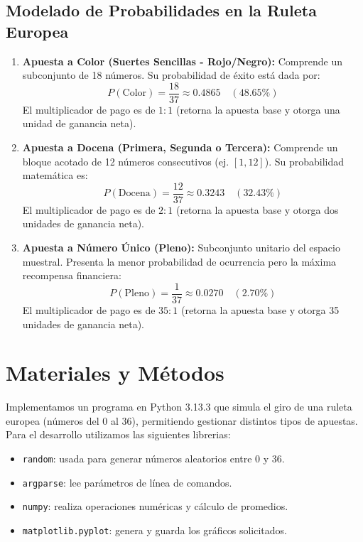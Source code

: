 \documentclass{article}
\begin{document}
\subsection{Modelado de Probabilidades en la Ruleta Europea}
\begin{enumerate}
    \item \textbf{Apuesta a Color (Suertes Sencillas - Rojo/Negro):} Comprende un subconjunto de 18 números. Su probabilidad de éxito está dada por:
    \begin{equation}
        P(\text{Color}) = \frac{18}{37} \approx 0.4865 \quad (48.65\%)
    \end{equation}
    El multiplicador de pago es de $1:1$ (retorna la apuesta base y otorga una unidad de ganancia neta).
    \item \textbf{Apuesta a Docena (Primera, Segunda o Tercera):} Comprende un bloque acotado de 12 números consecutivos (ej. $[1, 12]$). Su probabilidad matemática es:
    \begin{equation}
        P(\text{Docena}) = \frac{12}{37} \approx 0.3243 \quad (32.43\%)
    \end{equation}
    El multiplicador de pago es de $2:1$ (retorna la apuesta base y otorga dos unidades de ganancia neta).
    \item \textbf{Apuesta a Número Único (Pleno):} Subconjunto unitario del espacio muestral. Presenta la menor probabilidad de ocurrencia pero la máxima recompensa financiera:
    \begin{equation}
        P(\text{Pleno}) = \frac{1}{37} \approx 0.0270 \quad (2.70\%)
    \end{equation}
    El multiplicador de pago es de $35:1$ (retorna la apuesta base y otorga 35 unidades de ganancia neta).
\end{enumerate}


\section{Materiales y Métodos}
Implementamos un programa en Python 3.13.3 que simula el giro de una ruleta europea (números del 0 al 36), permitiendo gestionar distintos tipos de apuestas. Para el desarrollo utilizamos las siguientes librerias:
\begin{itemize}
  \item \texttt{random}: usada para generar números aleatorios entre 0 y 36.
  \item \texttt{argparse}: lee parámetros de línea de comandos.
  \item \texttt{numpy}: realiza operaciones numéricas y cálculo de promedios.
  \item \texttt{matplotlib.pyplot}: genera y guarda los gráficos solicitados.
\end{itemize}
\end{document}
